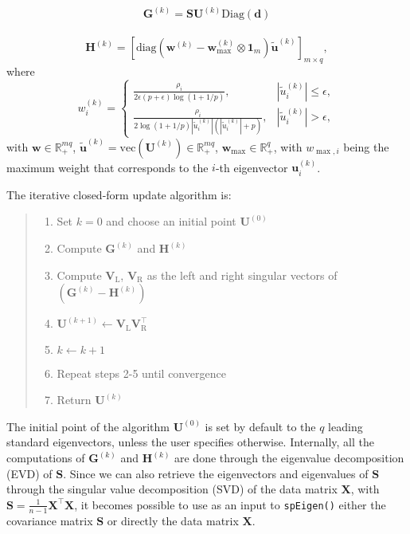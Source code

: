 \documentclass[]{article}
\providecommand{\tightlist}{%
  \setlength{\itemsep}{0pt}\setlength{\parskip}{0pt}}
\begin{document}
\[\mathbf{G}^{(k)} = \mathbf{S}\mathbf{U}^{(k)}\text{Diag}(\mathbf{d})\]\\
\[\mathbf{H}^{(k)}=\left[\text{diag}\left(\mathbf{w}^{(k)}-\mathbf{w}_{\max}^{(k)}\otimes\mathbf{1}_{m}\right)\mathbf{\tilde{u}}^{(k)}\right]_{m\times q},\]
where \[w_{i}^{(k)}= \begin{cases}
        \frac{\rho_i}{2\epsilon(p+\epsilon)\log(1+1/p)},& |\tilde{u}^{(k)}_{i}|\leq\epsilon,\\
        \frac{\rho_i}{2\log(1+1/p)|\tilde{u}^{(k)}_{i}|\left(|\tilde{u}^{(k)}_{i}|+p\right)},&                |\tilde{u}^{(k)}_{i}|>\epsilon,
        \end{cases}\] with \(\mathbf{w}\in\mathbb{R}_+^{mq}\),
\(\mathbf{\tilde{u}}^{(k)} = \text{vec}(\mathbf{U}^{(k)})\in\mathbb{R}_+^{mq}\),
\(\mathbf{w}_{\max}\in\mathbb{R}^q_+\), with \(w_{\max,i}\) being the
maximum weight that corresponds to the \(i\)-th eigenvector
\(\mathbf{u}^{(k)}_{i}\).

The iterative closed-form update algorithm is:

\begin{quote}
\begin{enumerate}
\def\labelenumi{\arabic{enumi}.}
\tightlist
\item
  Set \(k=0\) and choose an initial point \(\mathbf{U}^{(0)}\)\\
\item
  Compute \(\mathbf{G}^{(k)}\) and \(\mathbf{H}^{(k)}\)\\
\item
  Compute \(\mathbf{V}_{\text{L}}\), \(\mathbf{V}_{\text{R}}\) as the
  left and right singular vectors of
  \(\left(\mathbf{G}^{(k)} - \mathbf{H}^{(k)}\right)\)\\
\item
  \(\mathbf{U}^{(k+1)} \gets \mathbf{V}_{\text{L}}\mathbf{V}_{\text{R}}^\top\)\\
\item
  \(k \gets k+1\)\\
\item
  Repeat steps 2-5 until convergence\\
\item
  Return \(\mathbf{U}^{(k)}\)
\end{enumerate}
\end{quote}

The initial point of the algorithm \(\mathbf{U}^{(0)}\) is set by
default to the \(q\) leading standard eigenvectors, unless the user
specifies otherwise. Internally, all the computations of
\(\mathbf{G}^{(k)}\) and \(\mathbf{H}^{(k)}\) are done through the
eigenvalue decomposition (EVD) of \(\mathbf{S}\). Since we can also
retrieve the eigenvectors and eigenvalues of \(\mathbf{S}\) through the
singular value decomposition (SVD) of the data matrix \(\mathbf{X}\),
with \(\mathbf{S} = \frac{1}{n-1}\mathbf{X}^\top\mathbf{X}\), it becomes
possible to use as an input to \texttt{spEigen()} either the covariance
matrix \(\mathbf{S}\) or directly the data matrix \(\mathbf{X}\).
\end{document}
